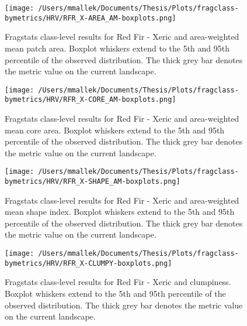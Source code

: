 \begin{figure}[!htbp]
\centering
    \texttt{[image: /Users/mmallek/Documents/Thesis/Plots/fragclass-bymetrics/HRV/RFR\_X-AREA\_AM-boxplots.png]}
  \caption{Fragstats class-level results for Red Fir - Xeric and area-weighted mean patch area. Boxplot whiskers extend to the 5th and 95th percentile of the observed distribution. The thick grey bar denotes the metric value on the current landscape.}
  \label{fig:rfrx_areaam}
\end{figure}


\begin{figure}[!htbp]
\centering
    \texttt{[image: /Users/mmallek/Documents/Thesis/Plots/fragclass-bymetrics/HRV/RFR\_X-CORE\_AM-boxplots.png]}
  \caption{Fragstats class-level results for Red Fir - Xeric and area-weighted mean core area. Boxplot whiskers extend to the 5th and 95th percentile of the observed distribution. The thick grey bar denotes the metric value on the current landscape.}
  \label{fig:rfrx_coream}
\end{figure}


\begin{figure}[!htbp]
\centering
    \texttt{[image: /Users/mmallek/Documents/Thesis/Plots/fragclass-bymetrics/HRV/RFR\_X-SHAPE\_AM-boxplots.png]}
  \caption{Fragstats class-level results for Red Fir - Xeric and area-weighted mean shape index. Boxplot whiskers extend to the 5th and 95th percentile of the observed distribution. The thick grey bar denotes the metric value on the current landscape.}
  \label{fig:rfrx_shapeam}
\end{figure}


\begin{figure}[!htbp]
\centering
    \texttt{[image: /Users/mmallek/Documents/Thesis/Plots/fragclass-bymetrics/HRV/RFR\_X-CLUMPY-boxplots.png]}
  \caption{Fragstats class-level results for Red Fir - Xeric and clumpiness. Boxplot whiskers extend to the 5th and 95th percentile of the observed distribution. The thick grey bar denotes the metric value on the current landscape.}
  \label{fig:rfrx_clumpy}
\end{figure}





